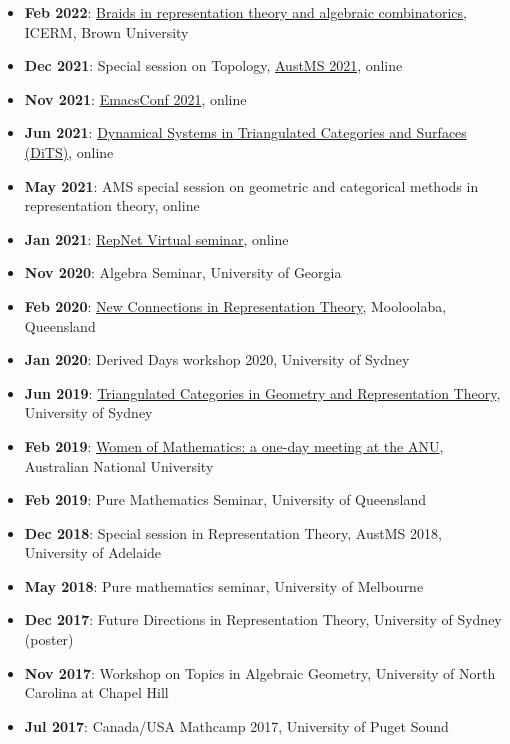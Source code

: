 \documentclass[a4paper]{moderncv}
\begin{document}
\begin{itemize}
\item \textbf{Feb 2022}: \href{https://icerm.brown.edu/programs/sp-s22/w1/}{Braids in representation theory and algebraic combinatorics}, ICERM, Brown University
\item \textbf{Dec 2021}: Special session on Topology, \href{https://austms.org.au/event/austms-2021/}{AustMS 2021}, online
\item \textbf{Nov 2021}: \href{https://emacsconf.org/2021/}{EmacsConf 2021}, online
\item \textbf{Jun 2021}: \href{https://sites.google.com/view/symposium-dits/}{Dynamical Systems in Triangulated Categories and Surfaces (DiTS)}, online
\item \textbf{May 2021}: AMS special session on geometric and categorical methods in representation theory, online
\item \textbf{Jan 2021}: \href{https://sites.google.com/view/repnetvirtualseminar/home}{RepNet Virtual seminar}, online
\item \textbf{Nov 2020}: Algebra Seminar, University of Georgia
\item \textbf{Feb 2020}: \href{https://sites.google.com/view/mooloolaba2020/home}{New Connections in Representation Theory}, Mooloolaba, Queensland
\item \textbf{Jan 2020}: Derived Days workshop 2020, University of Sydney
\item \textbf{Jun 2019}: \href{https://sites.google.com/site/ausreptheory/workshop-2019}{Triangulated Categories in Geometry and Representation Theory}, University of Sydney
\item \textbf{Feb 2019}: \href{https://genderinstitute.anu.edu.au/women-mathematics-one-day-meeting-anu}{Women of Mathematics: a one-day meeting at the ANU}, Australian National University
\item \textbf{Feb 2019}: Pure Mathematics Seminar, University of Queensland
\item \textbf{Dec 2018}: Special session in Representation Theory, AustMS 2018, University of Adelaide
\item \textbf{May 2018}: Pure mathematics seminar, University of Melbourne
\item \textbf{Dec 2017}: Future Directions in Representation Theory, University of Sydney (poster)
\item \textbf{Nov 2017}: Workshop on Topics in Algebraic Geometry, University of North Carolina at Chapel Hill
\item \textbf{Jul 2017}: Canada/USA Mathcamp 2017, University of Puget Sound

\end{itemize}
\end{document}

